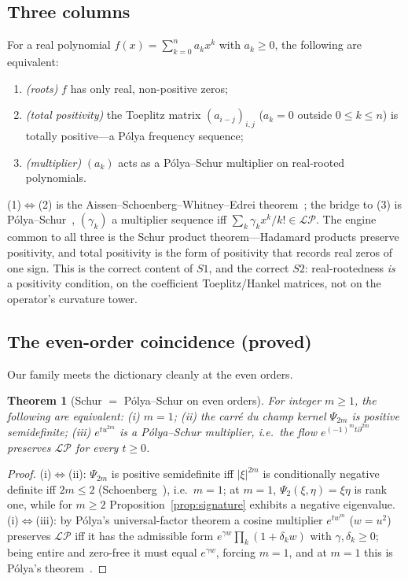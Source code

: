 \documentclass[11pt,reqno]{amsart}
\theoremstyle{plain}
\newtheorem{theorem}{Theorem}[section]
\theoremstyle{definition}
\theoremstyle{remark}
\newcommand{\LP}{\mathcal{LP}}
\begin{document}
\subsection{Three columns}
For a real polynomial $f(x)=\sum_{k=0}^n a_k x^k$ with $a_k\ge0$, the
following are equivalent:
\begin{enumerate}[label=(\arabic*)]
\item \emph{(roots)} $f$ has only real, non-positive zeros;
\item \emph{(total positivity)} the Toeplitz matrix $(a_{i-j})_{i,j}$
  ($a_k=0$ outside $0\le k\le n$) is totally positive---a P\'olya
  frequency sequence;
\item \emph{(multiplier)} $(a_k)$ acts as a P\'olya--Schur multiplier on
  real-rooted polynomials.
\end{enumerate}
(1)$\Leftrightarrow$(2) is the Aissen--Schoenberg--Whitney--Edrei
theorem~\cite{ASW}; the bridge to (3) is P\'olya--Schur~\cite{PolyaSchur2},
$(\gamma_k)$ a multiplier sequence iff $\sum_k\gamma_k x^k/k!\in\LP$. The
engine common to all three is the Schur product theorem---Hadamard
products preserve positivity, and total positivity is the form of
positivity that records real zeros of one sign. This is the correct
content of $S1$, and the correct $S2$: real-rootedness \emph{is} a
positivity condition, on the coefficient Toeplitz/Hankel matrices, not on
the operator's curvature tower.

\subsection{The even-order coincidence (proved)}
Our family meets the dictionary cleanly at the even orders.

\begin{theorem}[Schur $=$ P\'olya--Schur on even orders]\label{thm:dict}
For integer $m\ge1$, the following are equivalent:
\emph{(i)} $m=1$;
\emph{(ii)} the carr\'e du champ kernel $\Psi_{2m}$ is positive
semidefinite;
\emph{(iii)} $e^{tu^{2m}}$ is a P\'olya--Schur multiplier, i.e.\ the flow
$e^{(-1)^m t\partial^{2m}}$ preserves $\LP$ for every $t\ge0$.
\end{theorem}
\begin{proof}
(i)$\Leftrightarrow$(ii): $\Psi_{2m}$ is positive semidefinite iff
$|\xi|^{2m}$ is conditionally negative definite iff $2m\le2$
(Schoenberg~\cite{Schoenberg}), i.e.\ $m=1$; at $m=1$,
$\Psi_2(\xi,\eta)=\xi\eta$ is rank one, while for $m\ge2$
Proposition~\ref{prop:signature} exhibits a negative eigenvalue.
(i)$\Leftrightarrow$(iii): by P\'olya's universal-factor theorem a cosine
multiplier $e^{tw^m}$ ($w=u^2$) preserves $\LP$ iff it has the admissible
form $e^{\gamma w}\prod_k(1+\delta_k w)$ with $\gamma,\delta_k\ge0$; being
entire and zero-free it must equal $e^{\gamma w}$, forcing $m=1$, and at
$m=1$ this is P\'olya's theorem~\cite{FontesIBM}.
\end{proof}
\end{document}
